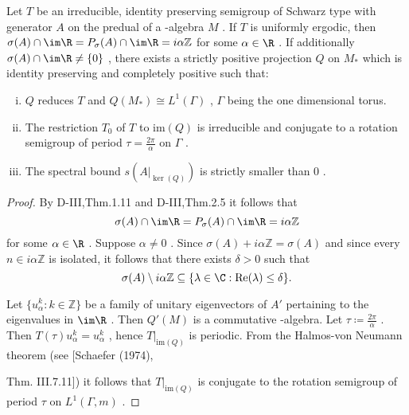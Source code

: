 \begin{proposition}\label{prop:d4-3.10}
Let $ T $  be an irreducible, identity preserving semigroup of Schwarz type with generator $ A $  on the predual of a \WA-algebra $ M $ .
If $ T $  is uniformly ergodic, then $ \sigma(A) \cap \im\R = P_{\sigma}(A) \cap \im\R = i\alpha\mathbb{Z} $  for some $ \alpha \in \R $ .
If additionally $ \sigma(A) \cap \im\R \neq \{0\} $ , there exists a strictly positive projection $ Q $  on $ M_{*} $  which is identity preserving and completely positive such that:
\begin{enumerate}[(i)]
\item
$ Q $  reduces $ T $  and $ Q(M_{*}) \cong L^{1}(\Gamma) $ , $ \Gamma $  being the one dimensional torus.

\item
The restriction $ T_{0} $  of $ T $  to $ \text{im}(Q) $  is irreducible and conjugate to a rotation semigroup of period $ \tau = \frac{2\pi}{\alpha} $  on $ \Gamma $ .

\item
The spectral bound $ s(A|_{\ker(Q)}) $  is strictly smaller than $ 0 $ .
\end{enumerate}
\end{proposition}


\begin{proof}
By D-III,Thm.1.11 and D-III,Thm.2.5 it follows that
\[
\sigma(A) \cap \im\R = P_{\sigma}(A) \cap \im\R = i\alpha\mathbb{Z}
\]
for some $ \alpha \in \R $ .
Suppose $ \alpha \neq 0 $ .
Since $ \sigma(A) + i\alpha\mathbb{Z} = \sigma(A) $  and since every $ n \in i\alpha\mathbb{Z} $  is isolated, it follows that there exists $ \delta > 0 $  such that
\[
\sigma(A) \setminus i\alpha\mathbb{Z} \subseteq \{\lambda \in \C: \text{Re}(\lambda) \leq \delta\}.
\]

Let $ \{u_{\alpha}^{k}: k \in \mathbb{Z}\} $  be a family of unitary eigenvectors of $ A' $  pertaining to the eigenvalues in $ \im\R $ .
Then $ Q'(M) $  is a commutative \WA-algebra.
Let $ \tau \coloneqq \frac{2\pi}{\alpha} $ .
Then $ T(\tau)u_{\alpha}^{k} = u_{\alpha}^{k} $ , hence $ T|_{\text{im}(Q)} $  is periodic.
From the Halmos-von Neumann theorem (see [Schaefer (1974),

\newpage

Thm. III.7.11]) it follows that $ T|_{\text{im}(Q)} $  is conjugate to the rotation semigroup of period $ \tau $  on $ L^{1}(\Gamma,m) $ .
\end{proof}

